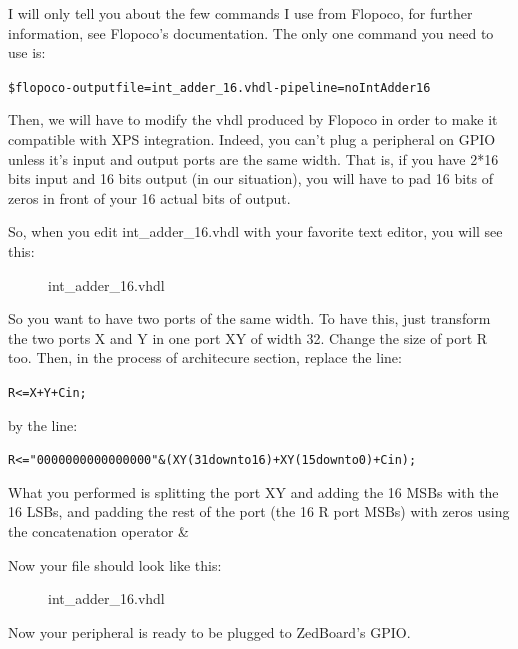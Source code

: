 \documentclass{article}
\begin{document}
		I will only tell you about the few commands I use from Flopoco, for
		further information, see Flopoco's documentation.
		The only one command you need to use is:
			
	\begin{alltt}
	\$ flopoco -outputfile=int\_adder\_16.vhdl -pipeline=no IntAdder 16
	\end{alltt}

		Then, we will have to modify the vhdl produced by Flopoco in order to
		make it compatible with XPS integration.
		Indeed, you can't plug a peripheral on GPIO unless it's input and output
		ports are the same width.
		That is, if you have 2*16 bits input and 16 bits output (in our
				situation), you will have to pad 16 bits of zeros in front of
		your 16 actual bits of output.

		So, when you edit int\_adder\_16.vhdl  with your favorite text editor, you
		will see this: \\
			\newpage
		\begin{figure}[!h]
		
		\caption{int\_adder\_16.vhdl}
		\end{figure}

		So you want to have two ports of the same width.
		To have this, just transform the two ports X and Y in one port XY of
		width 32.
		Change the size of port R too.
		Then, in the process of architecure section, replace the line:
		\begin{alltt}
		R <= X+Y+Cin;
		\end{alltt}
		by the line:
		\begin{alltt}
		R <= "0000000000000000" & ( XY(31 downto 16) + XY(15 downto 0) + Cin );
		\end{alltt}
		What you performed is splitting the port XY and adding the 16 MSBs with
		the 16 LSBs, and padding the rest of the port (the 16 R port MSBs) with
		zeros using the concatenation operator \&

		Now your file should look like this:\\
	
		\newpage
		\begin{figure}[!h]
		
		\caption{int\_adder\_16.vhdl}
		\end{figure}

		Now your peripheral is ready to be plugged to ZedBoard's GPIO.
\end{document}

